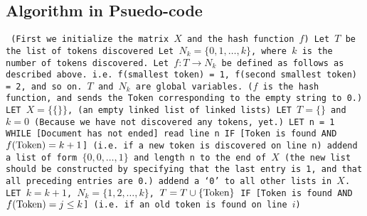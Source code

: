 \documentclass{article}
\begin{document}
\subsection*{Algorithm in Psuedo-code }
\texttt{  
(\textnormal{First we initialize the matrix $X$ and the hash function $f$}) \newline
Let $T$ be the list of tokens discovered \newline Let $N_k = \{0,1 ,\dots ,k\}$, where $k$ is the number of tokens discovered. \newline
Let $f: T \to N_k$ be defined as follows as described above. i.e. f(smallest token) = 1, f(second smallest token) = 2, and so on. $T$ and $N_k$ are global variables.   \newline 
\indent (\textnormal{$f$ is the hash function, and sends the Token corresponding to the empty string to 0.}) \newline
LET $X = \{\{\}\}$, \newline
\indent \textnormal{(an empty linked list of linked lists)} \newline
LET $T = \{\}$ and $k = 0$ \newline
\indent (\textnormal{Because we have not discovered any tokens, yet.})\newline
LET n = 1 \newline
WHILE [Document has not ended] \newline
\indent read line n \newline
\indent IF  [Token is found AND $f(\textnormal{Token}) =  k + 1$] \newline
\indent \indent \textnormal{(i.e. if a new token is discovered on line n)}  \newline
\indent \indent addend a list of form $\{0, 0, \dots, 1\}$ and length n to the end of $X$ 
\indent \indent \indent (\textnormal{the new list should be constructed by specifying that the \newline \indent \indent \indent last entry is 1, and that all preceding entries are 0.})
\newline 
\indent \indent addend a `0' to all other lists in $X$. \newline
\indent \indent LET $k = k+1$, $N_k = \{1,2, \dots, k\}$, $T = T \cup \{\textnormal{Token}\} $ \newline
\indent IF  [Token is found AND $f(\textnormal{Token}) = j \leq k$] \newline
\indent \indent \textnormal{(i.e. if an old token is found on line $i$)}  \newline
}
\end{document}
